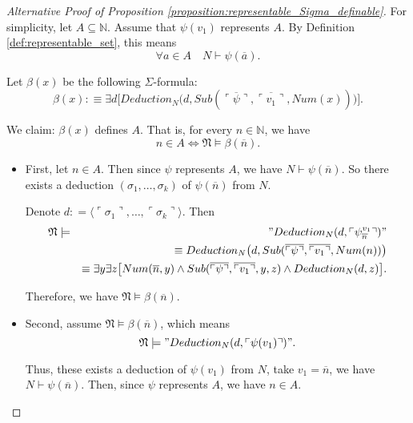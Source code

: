 \documentclass[11pt,letterpaper]{book}
\theoremstyle{definition}
\begin{document}
\begin{proof}[Alternative Proof of Proposition \ref{proposition:representable_Sigma_definable}]

For simplicity, let $A \subseteq \mathbb{N}$. Assume that $\psi (v_1)$ represents $A$. By Definition \ref{def:representable_set}, this means 
$$ \forall a \in A \quad N \vdash \psi(\overline{a}) .$$

Let $\beta (x)$ be the following $\Sigma$-formula:
\begin{equation}
\beta(x) :\equiv \exists d  \big[ Deduction_N \big( d, Sub( \overline{\ulcorner \psi \urcorner}, \overline{\ulcorner v_1 \urcorner}, Num(x) ) \big) \big] . \nonumber
\end{equation}

We claim: $\beta(x)$ defines $A$. That is, for every $n \in \mathbb{N}$, we have
$$ n \in A \iff \mathfrak{N} \models \beta (\overline{n}) .$$

\begin{itemize}
\item{First, let $n \in A$. Then since $\psi $ represents $A$, we have $N \vdash \psi (\overline{n} )$. So there exists a deduction $( \sigma_1, \ldots, \sigma_k )$ of $\psi (\overline{n})$ from $N$.

Denote $d : = \langle \ulcorner \sigma_1 \urcorner, \ldots, \ulcorner \sigma_k \urcorner \rangle$. Then
\begin{eqnarray*}
\mathfrak{N} &\models& " Deduction_N ( d, \ulcorner \psi_{\overline{n}} ^{v_1} \urcorner ) " \\
&\quad & \equiv  Deduction_N \big( d, Sub( \overline{\ulcorner \psi \urcorner}, \overline{\ulcorner v_1 \urcorner}, Num(n) ) \big) \\ 
& \quad & \equiv \exists y \exists z \big[ Num(\overline{n}, y) \land  Sub( \overline{\ulcorner \psi \urcorner}, \overline{\ulcorner v_1 \urcorner}, y, z ) \land Deduction_N (d, z) \big] . 
\end{eqnarray*}

Therefore, we have $\mathfrak{N} \models \beta(\overline{n})$.
}
\item{Second, assume $\mathfrak{N} \models \beta(\overline{n})$, which means
$$ \mathfrak{N} \models " Deduction_N (d, \ulcorner \psi (v_1) \urcorner) " .$$

Thus, these exists a deduction of $\psi(v_1)$ from $N$, take $v_1 = \overline{n}$, we have $N \vdash \psi( \overline{n} )$. Then, since $\psi$ represents $A$, we have $n \in A$.
}
\end{itemize}

\end{proof}
\end{document}
